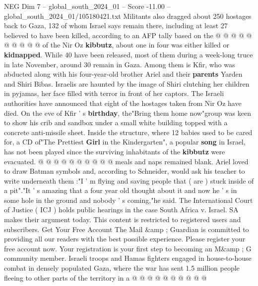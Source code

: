 \begin{textsample}{NEG Dim 7 – global\_south\_2024\_01 – Score -11.00 – global\_south\_2024\_01/105180421.txt}
Militants also dragged about 250 hostages back to Gaza, 132 of whom Israel says remain there, including at least 27 believed to have been killed, according to an AFP tally based on the @ @ @ @ @ @ @ @ @ @ of the Nir Oz \textbf{kibbutz}, about one in four was either killed or \textbf{kidnapped}.
While 40 have been released, most of them during a week-long truce in late November, around 30 remain in Gaza.
Among them is Kfir, who was abducted along with his four-year-old brother Ariel and their \textbf{parents} Yarden and Shiri Bibas.
Israelis are haunted by the image of Shiri clutching her children in pyjamas, her face filled with terror in front of her captors.
The Israeli authorities have announced that eight of the hostages taken from Nir Oz have died.
On the eve of Kfir ' s \textbf{birthday}, the"Bring them home now"group was keen to show his crib and sandbox under a small white building topped with a concrete anti-missile sheet.
Inside the structure, where 12 babies used to be cared for, a CD of"The Prettiest \textbf{Girl} in the Kindergarten", a popular \textbf{song} in Israel, has not been played since the surviving inhabitants of the \textbf{kibbutz} were evacuated. @ @ @ @ @ @ @ @ @ @ meals and naps remained blank.
Ariel loved to draw Batman symbols and, according to Schneider, would ask his teacher to write underneath them :"I ' m flying and saving people that ( are ) stuck inside of a pit"."It ' s amazing that a four year old thought about it and now he ' s in some hole in the ground and nobody ' s coming,"he said.
The International Court of Justice ( ICJ ) holds public hearings in the case South Africa v.
Israel.
SA makes their argument today.
This content is restricted to registered users and subscribers.
Get Your Free Account The Mail \&amp ; Guardian is committed to providing all our readers with the best possible experience.
Please register your free account now.
Your registration is your first step to becoming an M\&amp ; G community member.
Israeli troops and Hamas fighters engaged in house-to-house combat in densely populated Gaza, where the war has sent 1.5 million people fleeing to other parts of the territory in a @ @ @ @ @ @ @ @ @ @

\end{textsample}
